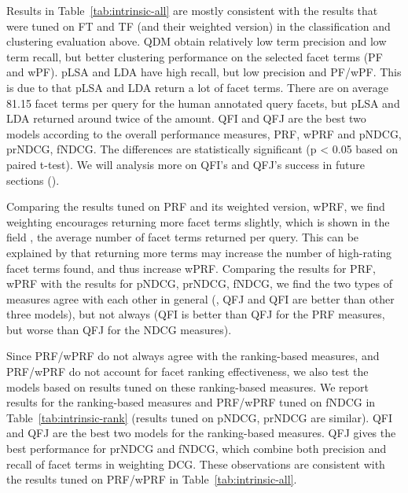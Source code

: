 Results in Table~\ref{tab:intrinsic-all} are mostly consistent with the results that were tuned on FT and TF (and their weighted version) in the classification and clustering evaluation above. QDM obtain relatively low term precision and low term recall, but better clustering performance on the selected facet terms (PF and wPF). pLSA and LDA have high recall, but low precision and PF/wPF. This is due to that pLSA and LDA return a lot of facet terms. There are on average 81.15 facet terms per query for the human annotated query facets, but pLSA and LDA returned around twice of the amount. QFI and QFJ are the best two models according to the overall performance measures, PRF, wPRF and pNDCG, prNDCG, fNDCG. The differences are statistically significant (p < 0.05 based on paired t-test). We will analysis more on QFI's and QFJ's success in future sections ().

Comparing the results tuned on PRF and its weighted version, wPRF, we find weighting encourages returning more facet terms slightly, which is shown in the field , the average number of facet terms returned per query. This can be explained by that returning more terms may increase the number of high-rating facet terms found, and thus increase wPRF. Comparing the results for PRF, wPRF with the results for pNDCG, prNDCG, fNDCG, we find the two types of measures agree with each other in general (\eg, QFJ and QFI are better than other three models), but not always (QFI is better than QFJ for the PRF measures, but worse than QFJ for the NDCG measures). 


Since PRF/wPRF do not always agree with the ranking-based measures, and PRF/wPRF do not account for facet ranking effectiveness, we also test the models based on results tuned on these ranking-based measures. We report results for the ranking-based measures and PRF/wPRF tuned on fNDCG in Table~\ref{tab:intrinsic-rank} (results tuned on pNDCG, prNDCG are similar). 
QFI and QFJ are the best two models for the ranking-based measures. QFJ gives the best performance for prNDCG and fNDCG, which combine both precision and recall of facet terms in weighting DCG. These observations are consistent with the results tuned on PRF/wPRF in Table~\ref{tab:intrinsic-all}. 

